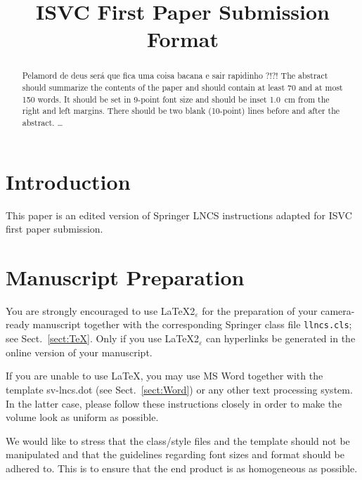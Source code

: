 \documentclass[runningheads]{llncs}
\begin{document}
\pagestyle{headings}

\mainmatter

\title{ISVC First Paper Submission Format}


\maketitle

\begin{abstract}

Pelamord de deus será que fica uma coisa bacana e sair rapidinho ?!?!
The abstract should summarize the contents of the paper and should
contain at least 70 and at most 150 words. It should be set in 9-point
font size and should be inset 1.0~cm from the right and left margins.
There should be two blank (10-point) lines before and after the
abstract.
\dots
\end{abstract}


\section{Introduction}
This paper is an edited version of Springer LNCS instructions adapted for
ISVC first paper submission.

\section{Manuscript Preparation}

You are strongly encouraged to use \LaTeX2$_\varepsilon$ for the
preparation of your
camera-ready manuscript together with the corresponding Springer
class file \verb+llncs.cls+;
see Sect.~\ref{sect:TeX}. Only if you use \LaTeX2$_\varepsilon$ can
hyperlinks be generated in the online version of your manuscript.

If you are unable to use \LaTeX, you may use MS Word together with the
template sv-lncs.dot (see Sect.~\ref{sect:Word}) or any other text
processing system. In the latter case, please follow
these instructions closely in order to make the volume
look as uniform as possible.

We would like to stress that the class/style files and the template
should not be manipulated and that the guidelines regarding font sizes
and format should be adhered to. This is to ensure that the end product
is as homogeneous as possible.
\end{document}
